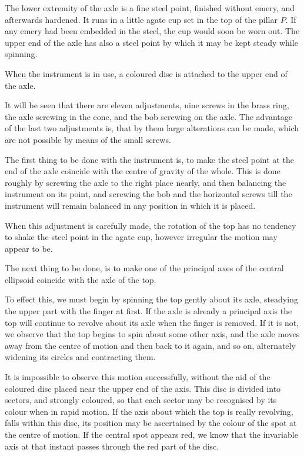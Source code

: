 \documentclass[12pt]{article}
\begin{document}
The lower extremity of the axle is a fine steel point, finished
without emery, and afterwards hardened.  It runs in a little agate cup
set in the top of the pillar $P$.  If any emery had been embedded in
the steel, the cup would soon be worn out.  The upper end of the axle
has also a steel point by which it may be kept steady while spinning.

When the instrument is in use, a coloured disc is attached to the
upper end of the axle.

It will be seen that there are eleven adjustments, nine screws in the
brass ring, the axle screwing in the cone, and the bob screwing on the
axle.  The advantage of the last two adjustments is, that by them
large alterations can be made, which are not possible by means of the
small screws.

The first thing to be done with the instrument is, to make the steel
point at the end of the axle coincide with the centre of gravity of
the whole.  This is done roughly by screwing the axle to the right
place nearly, and then balancing the instrument on its point, and
screwing the bob and the horizontal screws till the instrument will
remain balanced in any position in which it is placed.

When this adjustment is carefully made, the rotation of the top has no
tendency to shake the steel point in the agate cup, however irregular
the motion may appear to be.

The next thing to be done, is to make one of the principal axes of the
central ellipsoid coincide with the axle of the top.

To effect this, we must begin by spinning the top gently about its
axle, steadying the upper part with the finger at first.  If the axle
is already a principal axis the top will continue to revolve about its
axle when the finger is removed.  If it is not, we observe that the
top begins to spin about some other axis, and the axle moves away from
the centre of motion and then back to it again, and so on, alternately
widening its circles and contracting them.

It is impossible to observe this motion successfully, without the aid
of the coloured disc placed near the upper end of the axis.  This disc
is divided into sectors, and strongly coloured, so that each sector
may be recognised by its colour when in rapid motion.  If the axis
about which the top is really revolving, falls within this disc, its
position may be ascertained by the colour of the spot at the centre of
motion.  If the central spot appears red, we know that the invariable
axis at that instant passes through the red part of the disc.
\end{document}
